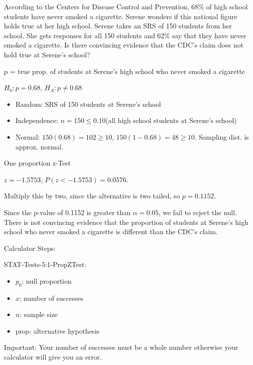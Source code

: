 \documentclass[../stats.tex]{subfiles}
\begin{document}
\pagebreak
\begin{example}
    According to the Centers for Disease Control and Prevention, 68\% of high school students have never smoked a cigarette. Serene wonders if this national figure holds true at her high school. Serene takes an SRS of 150 students from her school.
    She gets responses for all 150 students and 62\% say that they have never smoked a cigarette. Is there convincing evidence that the CDC's claim does not hold true at Serene's school?

    p = true prop. of students at Serene's high school who never smoked a cigarette

    $H_0: p=0.68$, $H_A: p\neq 0.68$

    \begin{itemize}
        \item Random: SRS of 150 students at Serene's school
        \item Independence: $n=150\leq 0.10$(all high school students at Serene's school)
        \item Normal: $150(0.68)=102\geq 10$, $150(1-0.68)=48\geq 10$. Sampling dist. is approx. normal.
    \end{itemize}

    One proportion z-Test 

    $z=-1.5753$, $P(z<-1.5753)=0.0576$.

    Multiply this by two, since the alternative is two tailed, so $p=0.1152$.

    Since the p-value of 0.1152 is greater than $\alpha=0.05$, we fail to reject the null. There is not convincing evidence that the proportion of students at Serene's high school who never smoked a cigarette is different than the CDC's claim.
\end{example}

Calculator Steps:

STAT-Tests-5:1-PropZTest:
\begin{itemize}
    \item $p_0$: null proportion 
    \item $x$: number of successes
    \item $n$: sample size 
    \item prop: alternative hypothesis
\end{itemize}
Important: Your number of successes must be a whole number otherwise your calculator will give you an error.

\pagebreak
\end{document}
